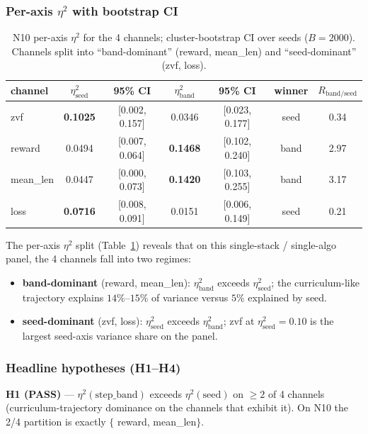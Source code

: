 \documentclass{article}  \usepackage[preprint,nonatbib]{neurips_2026} \usepackage[numbers]{natbib}
\begin{document}
\subsubsection{Per-axis $\eta^2$ with bootstrap CI}
\label{sec:p5-iter133-per-axis}
\begin{table}[t]
\centering
\small
\begin{tabular}{lcccccc}
\toprule
channel & $\eta^2_{\mathrm{seed}}$ & 95\% CI & $\eta^2_{\mathrm{band}}$ & 95\% CI & winner & $R_{\mathrm{band/seed}}$\\
\midrule
zvf       & \textbf{0.1025} & [0.002, 0.157] & 0.0346 & [0.023, 0.177] & seed & 0.34\\
reward    & 0.0494 & [0.007, 0.064] & \textbf{0.1468} & [0.102, 0.240] & band & 2.97\\
mean\_len & 0.0447 & [0.000, 0.073] & \textbf{0.1420} & [0.103, 0.255] & band & 3.17\\
loss      & \textbf{0.0716} & [0.008, 0.091] & 0.0151 & [0.006, 0.149] & seed & 0.21\\
\bottomrule
\end{tabular}
\caption{N10 per-axis $\eta^2$ for the 4 channels; cluster-bootstrap CI over
seeds ($B=2000$).  Channels split into ``band-dominant'' (reward, mean\_len)
and ``seed-dominant'' (zvf, loss).}
\label{tab:p5-iter133-eta2}
\end{table}

The per-axis $\eta^2$ split (Table~\ref{tab:p5-iter133-eta2}) reveals that
on this single-stack / single-algo panel, the 4 channels fall into two
regimes:
\begin{itemize}
\item \textbf{band-dominant} (reward, mean\_len): $\eta^2_{\mathrm{band}}$
  exceeds $\eta^2_{\mathrm{seed}}$; the curriculum-like trajectory explains
  $14\%$--$15\%$ of variance versus $5\%$ explained by seed.
\item \textbf{seed-dominant} (zvf, loss): $\eta^2_{\mathrm{seed}}$ exceeds
  $\eta^2_{\mathrm{band}}$; zvf at $\eta^2_{\mathrm{seed}}=0.10$ is the
  largest seed-axis variance share on the panel.
\end{itemize}

\subsubsection{Headline hypotheses (H1--H4)}
\label{sec:p5-iter133-headlines}
\textbf{H1 (PASS)} --- $\eta^2(\mathrm{step\_band})$ exceeds $\eta^2(\mathrm{seed})$
on $\geq 2$ of 4 channels (curriculum-trajectory dominance on the channels
that exhibit it). On N10 the 2/4 partition is exactly $\{$
reward, mean\_len$\}$.
\end{document}
